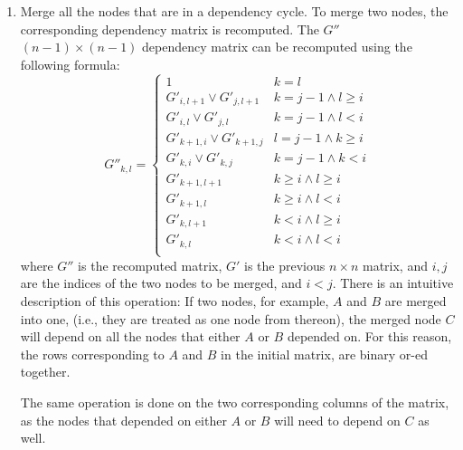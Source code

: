\documentclass[12pt]{article}
\begin{document}
\begin{enumerate}
    \item Merge all the nodes that are in a dependency cycle. To merge two
        nodes, the corresponding dependency matrix is recomputed. The $G''$
        $(n-1)\times(n-1)$ dependency matrix can be recomputed using the
        following formula:
\[
    G''_{k,l} = 
    \begin{cases} 
        1 & k = l \\
        G'_{i,l+1} \lor G'_{j,l+1} & k = j - 1 \land l \ge i \\
        G'_{i,l} \lor G'_{j,l} & k = j - 1 \land l < i \\
        G'_{k+1,i} \lor G'_{k+1,j} & l = j - 1 \land k \ge i \\
        G'_{k,i} \lor G'_{k,j} & k = j - 1 \land k < i \\
        G'_{k+1,l+1} & k \ge i \land l \ge i \\
        G'_{k+1,l} & k \ge i \land l < i \\
        G'_{k,l+1} & k < i \land l \ge i \\
        G'_{k,l} & k < i \land l < i \\
    \end{cases}
\]
where $G''$ is the recomputed matrix, $G'$ is the previous $n \times n$ matrix,
and $i,j$ are the indices of the two nodes to be merged, and $i < j$. There is
an intuitive description of this operation: If two nodes, for example, $A$ and
$B$ are merged into one, (i.e., they are treated as one node from thereon), the
merged node $C$ will depend on all the nodes that either $A$ or $B$ depended on.
For this reason, the rows corresponding to $A$ and $B$ in the initial matrix,
are binary or-ed together.
\begin{center}
\end{center}
The same operation is done on the two corresponding columns of the matrix, as
the nodes that depended on either $A$ or $B$ will need to depend on $C$ as well.


\end{enumerate}
\end{document}
